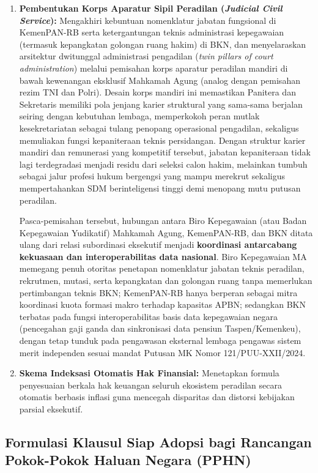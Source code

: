 \documentclass[12pt,a4paper,twocolumn]{article}
\begin{document}
\begin{enumerate}
    \item \textbf{Pembentukan Korps Aparatur Sipil Peradilan (\textit{Judicial Civil Service}):} Mengakhiri kebuntuan nomenklatur jabatan fungsional di KemenPAN-RB serta ketergantungan teknis administrasi kepegawaian (termasuk kepangkatan golongan ruang hakim) di BKN, dan menyelaraskan arsitektur dwitunggal administrasi pengadilan (\textit{twin pillars of court administration}) melalui pemisahan korps aparatur peradilan mandiri di bawah kewenangan eksklusif Mahkamah Agung (analog dengan pemisahan rezim TNI dan Polri). Desain korps mandiri ini memastikan Panitera dan Sekretaris memiliki pola jenjang karier struktural yang sama-sama berjalan seiring dengan kebutuhan lembaga, memperkokoh peran mutlak kesekretariatan sebagai tulang penopang operasional pengadilan, sekaligus memuliakan fungsi kepaniteraan teknis persidangan. Dengan struktur karier mandiri dan remunerasi yang kompetitif tersebut, jabatan kepaniteraan tidak lagi terdegradasi menjadi residu dari seleksi calon hakim, melainkan tumbuh sebagai jalur profesi hukum bergengsi yang mampu merekrut sekaligus mempertahankan SDM berinteligensi tinggi demi menopang mutu putusan peradilan.

          Pasca-pemisahan tersebut, hubungan antara Biro Kepegawaian (atau Badan Kepegawaian Yudikatif) Mahkamah Agung, KemenPAN-RB, dan BKN ditata ulang dari relasi subordinasi eksekutif menjadi \textbf{koordinasi antarcabang kekuasaan dan interoperabilitas data nasional}. Biro Kepegawaian MA memegang penuh otoritas penetapan nomenklatur jabatan teknis peradilan, rekrutmen, mutasi, serta kepangkatan dan golongan ruang tanpa memerlukan pertimbangan teknis BKN; KemenPAN-RB hanya berperan sebagai mitra koordinasi kuota formasi makro terhadap kapasitas APBN; sedangkan BKN terbatas pada fungsi interoperabilitas basis data kepegawaian negara (pencegahan gaji ganda dan sinkronisasi data pensiun Taspen/Kemenkeu), dengan tetap tunduk pada pengawasan eksternal lembaga pengawas sistem merit independen sesuai mandat Putusan MK Nomor 121/PUU-XXII/2024.
    \item \textbf{Skema Indeksasi Otomatis Hak Finansial:} Menetapkan formula penyesuaian berkala hak keuangan seluruh ekosistem peradilan secara otomatis berbasis inflasi guna mencegah disparitas dan distorsi kebijakan parsial eksekutif.
\end{enumerate}

\subsection{Formulasi Klausul Siap Adopsi bagi Rancangan Pokok-Pokok Haluan Negara (PPHN)}
\end{document}
